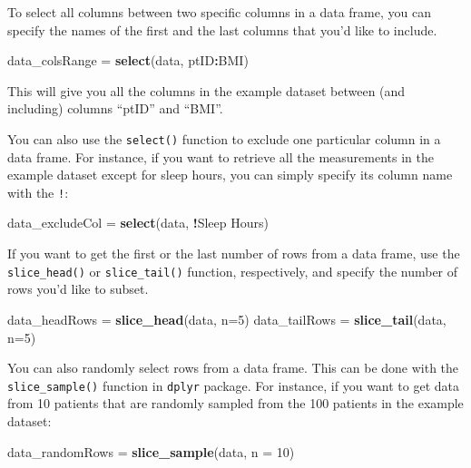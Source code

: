 \documentclass[
]{article}
\newenvironment{Shaded}{\begin{snugshade}}{\end{snugshade}}
\newcommand{\AttributeTok}[1]{\textcolor[rgb]{0.13,0.29,0.53}{#1}}
\newcommand{\DecValTok}[1]{\textcolor[rgb]{0.00,0.00,0.81}{#1}}
\newcommand{\FunctionTok}[1]{\textcolor[rgb]{0.13,0.29,0.53}{\textbf{#1}}}
\newcommand{\NormalTok}[1]{#1}
\newcommand{\OtherTok}[1]{\textcolor[rgb]{0.56,0.35,0.01}{#1}}
\newcommand{\SpecialCharTok}[1]{\textcolor[rgb]{0.81,0.36,0.00}{\textbf{#1}}}
\newcommand{\StringTok}[1]{\textcolor[rgb]{0.31,0.60,0.02}{#1}}
\begin{document}
To select all columns between two specific columns in a data frame, you
can specify the names of the first and the last columns that you'd like
to include.

\begin{Shaded}
\begin{Highlighting}[]
\NormalTok{data\_colsRange }\OtherTok{=} \FunctionTok{select}\NormalTok{(data, ptID}\SpecialCharTok{:}\NormalTok{BMI)}
\end{Highlighting}
\end{Shaded}

This will give you all the columns in the example dataset between (and
including) columns ``ptID'' and ``BMI''.

You can also use the \texttt{select()} function to exclude one
particular column in a data frame. For instance, if you want to retrieve
all the measurements in the example dataset except for sleep hours, you
can simply specify its column name with the \texttt{!}:

\begin{Shaded}
\begin{Highlighting}[]
\NormalTok{data\_excludeCol }\OtherTok{=} \FunctionTok{select}\NormalTok{(data, }\SpecialCharTok{!}\StringTok{\textasciigrave{}}\AttributeTok{Sleep Hours}\StringTok{\textasciigrave{}}\NormalTok{)}
\end{Highlighting}
\end{Shaded}

If you want to get the first or the last number of rows from a data
frame, use the \texttt{slice\_head()} or \texttt{slice\_tail()}
function, respectively, and specify the number of rows you'd like to
subset.

\begin{Shaded}
\begin{Highlighting}[]
\NormalTok{data\_headRows }\OtherTok{=} \FunctionTok{slice\_head}\NormalTok{(data, }\AttributeTok{n=}\DecValTok{5}\NormalTok{)}
\NormalTok{data\_tailRows }\OtherTok{=} \FunctionTok{slice\_tail}\NormalTok{(data, }\AttributeTok{n=}\DecValTok{5}\NormalTok{)}
\end{Highlighting}
\end{Shaded}

You can also randomly select rows from a data frame. This can be done
with the \texttt{slice\_sample()} function in \texttt{dplyr} package.
For instance, if you want to get data from 10 patients that are randomly
sampled from the 100 patients in the example dataset:

\begin{Shaded}
\begin{Highlighting}[]
\NormalTok{data\_randomRows }\OtherTok{=} \FunctionTok{slice\_sample}\NormalTok{(data, }\AttributeTok{n =} \DecValTok{10}\NormalTok{)}
\end{Highlighting}
\end{Shaded}
\end{document}
